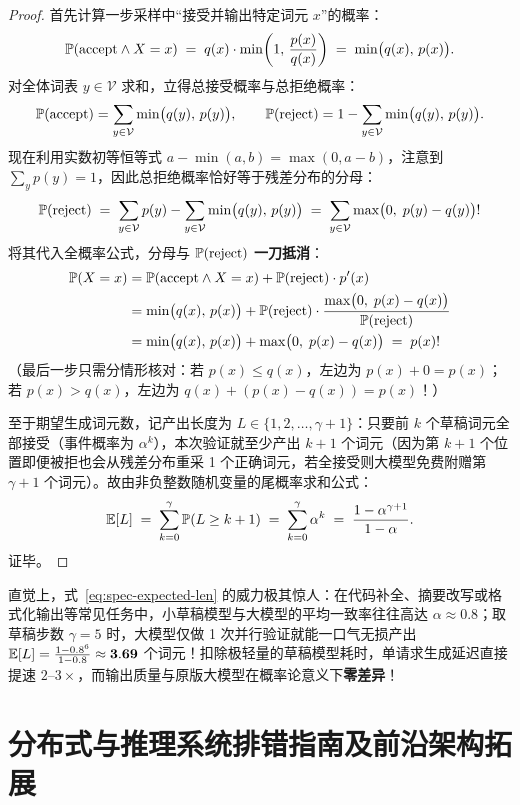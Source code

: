 \begin{proof}
首先计算一步采样中“接受并输出特定词元 $x$”的概率：
\[
  \mathbb{P}(\text{accept} \wedge X = x)
  \;=\; q(x) \cdot \min\!\left(1,\, \frac{p(x)}{q(x)}\right)
  \;=\; \min\!\big(q(x),\, p(x)\big).
\]
对全体词表 $y \in \mathcal{V}$ 求和，立得总接受概率与总拒绝概率：
\[
  \mathbb{P}(\text{accept}) = \sum_{y \in \mathcal{V}} \min\!\big(q(y),\, p(y)\big), \qquad
  \mathbb{P}(\text{reject}) = 1 - \sum_{y \in \mathcal{V}} \min\!\big(q(y),\, p(y)\big).
\]
现在利用实数初等恒等式 $a - \min(a, b) = \max(0, a - b)$，注意到 $\sum_{y} p(y) = 1$，因此总拒绝概率恰好等于残差分布的分母：
\[
  \mathbb{P}(\text{reject})
  \;=\; \sum_{y \in \mathcal{V}} p(y) - \sum_{y \in \mathcal{V}} \min\!\big(q(y),\, p(y)\big)
  \;=\; \sum_{y \in \mathcal{V}} \max\!\big(0,\; p(y) - q(y)\big)!
\]
将其代入全概率公式，分母与 $\mathbb{P}(\text{reject})$ \textbf{一刀抵消}：
\begin{align*}
  \mathbb{P}(X = x)
  &= \mathbb{P}(\text{accept} \wedge X = x) + \mathbb{P}(\text{reject}) \cdot p'(x) \\
  &= \min\!\big(q(x),\, p(x)\big) + \mathbb{P}(\text{reject}) \cdot \frac{\max\!\big(0,\; p(x) - q(x)\big)}{\mathbb{P}(\text{reject})} \\
  &= \min\!\big(q(x),\, p(x)\big) + \max\!\big(0,\; p(x) - q(x)\big)
  \;=\; p(x)!
\end{align*}
（最后一步只需分情形核对：若 $p(x) \le q(x)$，左边为 $p(x) + 0 = p(x)$；若 $p(x) > q(x)$，左边为 $q(x) + (p(x) - q(x)) = p(x)$！）

至于期望生成词元数，记产出长度为 $L \in \{1, 2, \dots, \gamma + 1\}$：只要前 $k$ 个草稿词元全部接受（事件概率为 $\alpha^k$），本次验证就至少产出 $k + 1$ 个词元（因为第 $k+1$ 个位置即便被拒也会从残差分布重采 1 个正确词元，若全接受则大模型免费附赠第 $\gamma + 1$ 个词元）。故由非负整数随机变量的尾概率求和公式：
\[
  \mathbb{E}[L] \;=\; \sum_{k=0}^{\gamma} \mathbb{P}(L \ge k + 1) \;=\; \sum_{k=0}^{\gamma} \alpha^k \;=\; \frac{1 - \alpha^{\gamma + 1}}{1 - \alpha}.
\]
证毕。
\end{proof}

直觉上，式~\eqref{eq:spec-expected-len} 的威力极其惊人：在代码补全、摘要改写或格式化输出等常见任务中，小草稿模型与大模型的平均一致率往往高达 $\alpha \approx 0.8$；取草稿步数 $\gamma = 5$ 时，大模型仅做 1 次并行验证就能一口气无损产出 $\mathbb{E}[L] = \frac{1 - 0.8^6}{1 - 0.8} \approx \mathbf{3.69}$ 个词元！扣除极轻量的草稿模型耗时，单请求生成延迟直接提速 $2\text{--}3\times$，而输出质量与原版大模型在概率论意义下\textbf{零差异}！

\section{分布式与推理系统排错指南及前沿架构拓展}
\label{sec:sys-pitfalls-ext}


